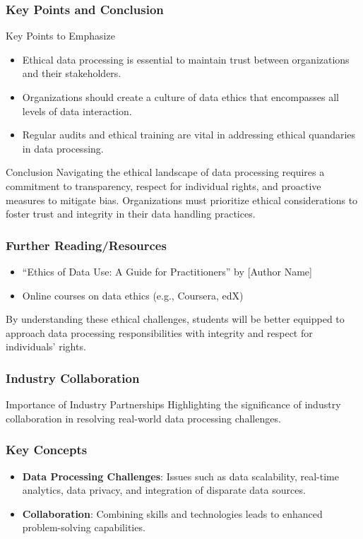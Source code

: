 \documentclass{beamer}
\begin{document}
\begin{frame}[fragile]
    \frametitle{Key Points and Conclusion}
    \begin{block}{Key Points to Emphasize}
        \begin{itemize}
            \item Ethical data processing is essential to maintain trust between organizations and their stakeholders.
            \item Organizations should create a culture of data ethics that encompasses all levels of data interaction.
            \item Regular audits and ethical training are vital in addressing ethical quandaries in data processing.
        \end{itemize}
    \end{block}

    \begin{block}{Conclusion}
        Navigating the ethical landscape of data processing requires a commitment to transparency, respect for individual rights, and proactive measures to mitigate bias. Organizations must prioritize ethical considerations to foster trust and integrity in their data handling practices.
    \end{block}
\end{frame}

\begin{frame}[fragile]
    \frametitle{Further Reading/Resources}
    \begin{itemize}
        \item ``Ethics of Data Use: A Guide for Practitioners'' by [Author Name]
        \item Online courses on data ethics (e.g., Coursera, edX)
    \end{itemize}
    By understanding these ethical challenges, students will be better equipped to approach data processing responsibilities with integrity and respect for individuals' rights.
\end{frame}

\begin{frame}[fragile]
    \frametitle{Industry Collaboration}
    \begin{block}{Importance of Industry Partnerships}
        Highlighting the significance of industry collaboration in resolving real-world data processing challenges.
    \end{block}
\end{frame}

\begin{frame}[fragile]
    \frametitle{Key Concepts}
    \begin{itemize}
        \item \textbf{Data Processing Challenges}: Issues such as data scalability, real-time analytics, data privacy, and integration of disparate data sources.
        \item \textbf{Collaboration}: Combining skills and technologies leads to enhanced problem-solving capabilities.
    \end{itemize}
\end{frame}
\end{document}
